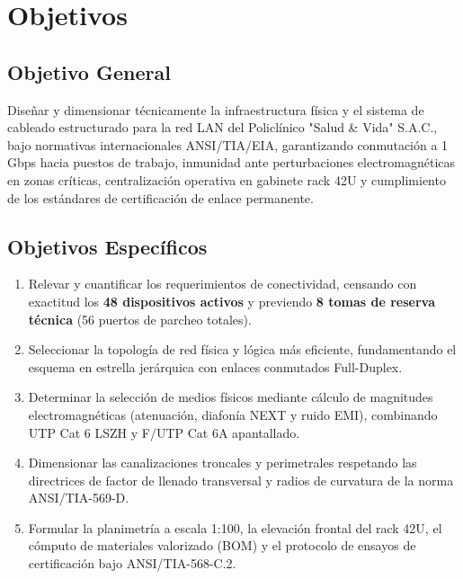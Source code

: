 \documentclass[11pt,a4paper]{article}
\begin{document}
\section{Objetivos}

\subsection{Objetivo General}
Diseñar y dimensionar técnicamente la infraestructura física y el sistema de cableado estructurado para la red LAN del Policlínico "Salud \& Vida" S.A.C., bajo normativas internacionales ANSI/TIA/EIA, garantizando conmutación a 1 Gbps hacia puestos de trabajo, inmunidad ante perturbaciones electromagnéticas en zonas críticas, centralización operativa en gabinete rack 42U y cumplimiento de los estándares de certificación de enlace permanente.

\subsection{Objetivos Específicos}
\begin{enumerate}[noitemsep]
    \item Relevar y cuantificar los requerimientos de conectividad, censando con exactitud los \textbf{48 dispositivos activos} y previendo \textbf{8 tomas de reserva técnica} (56 puertos de parcheo totales).
    \item Seleccionar la topología de red física y lógica más eficiente, fundamentando el esquema en estrella jerárquica con enlaces conmutados Full-Duplex.
    \item Determinar la selección de medios físicos mediante cálculo de magnitudes electromagnéticas (atenuación, diafonía NEXT y ruido EMI), combinando UTP Cat 6 LSZH y F/UTP Cat 6A apantallado.
    \item Dimensionar las canalizaciones troncales y perimetrales respetando las directrices de factor de llenado transversal y radios de curvatura de la norma ANSI/TIA-569-D.
    \item Formular la planimetría a escala 1:100, la elevación frontal del rack 42U, el cómputo de materiales valorizado (BOM) y el protocolo de ensayos de certificación bajo ANSI/TIA-568-C.2.
\end{enumerate}

\end{document}
